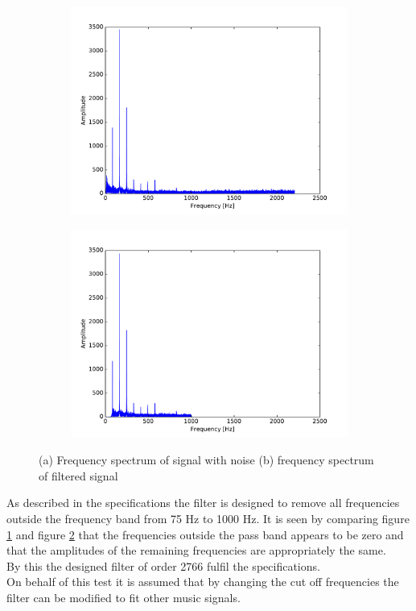 \begin{figure}[H]
\centering
\begin{subfigure}{0.49\textwidth}
\centering
\includegraphics[width=\textwidth]{figures/filtertest/SIGNAL.pdf}
\caption{}
\label{fig:SIGNAL}
\end{subfigure}
\begin{subfigure}{0.49\textwidth}
\centering
\includegraphics[width=\textwidth]{figures/filtertest/filt_SIGNAL.pdf}
\caption{}
\label{fig:filt_SIGNAL}
\end{subfigure}
\caption{(a) Frequency spectrum of signal with noise (b) frequency spectrum of filtered signal}
\label{fig:test_res}
\end{figure}
As described in the specifications the filter is designed to remove all frequencies outside the frequency band from 75 Hz to 1000 Hz. It is seen by comparing figure \ref{fig:SIGNAL} and figure \ref{fig:filt_SIGNAL} that the frequencies outside the pass band appears to be zero and that the amplitudes of the remaining frequencies are appropriately the same. \\
By this the designed filter of order 2766 fulfil the specifications.\\
On behalf of this test it is assumed that by changing the cut off frequencies the filter can be modified to fit other music signals.  